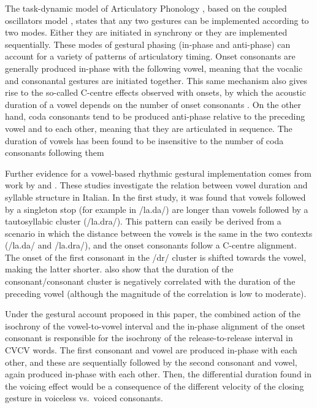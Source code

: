 \documentclass[12pt,a4paper,]{article}
\begin{document}
The task-dynamic model \citep{saltzman2008} of Articulatory Phonology
\citep{ohala1986a, browman1988, browman1992}, based on the coupled
oscillators model \citep{odell2008}, states that any two gestures can be
implemented according to two modes. Either they are initiated in
synchrony or they are implemented sequentially. These modes of gestural
phasing (in-phase and anti-phase) can account for a variety of patterns
of articulatory timing. Onset consonants are generally produced in-phase
with the following vowel, meaning that the vocalic and consonantal
gestures are initiated together. This same mechanism also gives rise to
the so-called C-centre effects observed with onsets, by which the
acoustic duration of a vowel depends on the number of onset consonants
\citep{browman1988, marin2010, hermes2013, marin2014}. On the other
hand, coda consonants tend to be produced anti-phase relative to the
preceding vowel and to each other, meaning that they are articulated in
sequence. The duration of vowels has been found to be insensitive to the
number of coda consonants following them \citep{marin2010, marin2014}

Further evidence for a vowel-based rhythmic gestural implementation
comes from work by \citet{farnetani1986} and \citet{celata2014}. These
studies investigate the relation between vowel duration and syllable
structure in Italian. In the first study, it was found that vowels
followed by a singleton stop (for example in /la.da/) are longer than
vowels followed by a tautosyllabic cluster (/la.dra/). This pattern can
easily be derived from a scenario in which the distance between the
vowels is the same in the two contexts (/la.da/ and /la.dra/), and the
onset consonants follow a C-centre alignment. The onset of the first
consonant in the /dr/ cluster is shifted towards the vowel, making the
latter shorter. \citet{celata2014} also show that the duration of the
consonant/consonant cluster is negatively correlated with the duration
of the preceding vowel (although the magnitude of the correlation is low
to moderate).

Under the gestural account proposed in this paper, the combined action
of the isochrony of the vowel-to-vowel interval and the in-phase
alignment of the onset consonant is responsible for the isochrony of the
release-to-release interval in CVCV words. The first consonant and vowel
are produced in-phase with each other, and these are sequentially
followed by the second consonant and vowel, again produced in-phase with
each other. Then, the differential duration found in the voicing effect
would be a consequence of the different velocity of the closing gesture
in voiceless vs.~voiced consonants.
\end{document}
